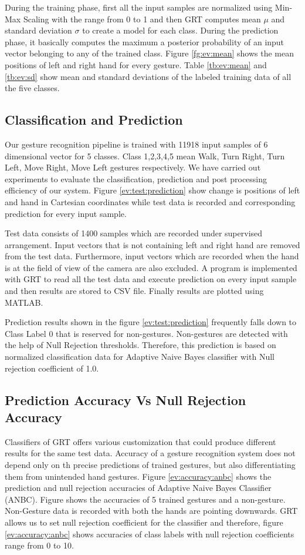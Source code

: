 During the training phase, first all the input samples are normalized using Min-Max Scaling with the range from 0 to 1 and then GRT computes mean $\mu$ and standard deviation $\sigma$ to create a model for each class. During the prediction phase, it basically computes the maximum a posterior probability of an input vector belonging to any of the trained class. Figure \ref{fg:ev:mean} shows the mean positions of left and right hand for every gesture. Table \ref{tb:ev:mean} and \ref{tb:ev:sd} show mean and standard deviations of the labeled training data of all the five classes. 

\subsection{Classification and Prediction} Our gesture recognition pipeline is trained with 11918 input samples of 6 dimensional vector for 5 classes. Class 1,2,3,4,5 mean Walk, Turn Right, Turn Left, Move Right, Move Left gestures respectively. We have carried out experiments to evaluate the classification, prediction and post processing efficiency of our system. Figure \ref{ev:test:prediction} show change is positions of left and hand in Cartesian coordinates while test data is recorded and corresponding prediction for every input sample.

Test data consists of 1400 samples which are recorded under supervised arrangement. Input vectors that is not containing left and right hand are removed from the test data. Furthermore, input vectors which are recorded when the hand is at the field of view of the camera are also excluded. A program is implemented with GRT to read all the test data and execute prediction on every input sample and then results are stored to CSV file. Finally results are plotted using MATLAB.

Prediction results shown in the figure \ref{ev:test:prediction} frequently falls down to Class Label 0 that is reserved for non-gestures. Non-gestures are detected with the help of Null Rejection thresholds. Therefore, this prediction is based on normalized classification data for Adaptive Naive Bayes classifier with Null rejection coefficient of 1.0.

\subsection{Prediction Accuracy Vs Null Rejection Accuracy} \label{sec:ev:accuracy} Classifiers of GRT offers various customization that could produce different results for the same test data. Accuracy of a gesture recognition system does not depend only on th precise predictions of trained gestures, but also differentiating them from unintended hand gestures. Figure \ref{ev:accuracy:anbc} shows the prediction and null rejection accuracies of Adaptive Naive Bayes Classifier (ANBC). Figure shows the accuracies of 5 trained gestures and a non-gesture. Non-Gesture data is recorded with both the hands are pointing downwards. GRT allows us to set null rejection coefficient for the classifier and therefore, figure \ref{ev:accuracy:anbc} shows accuracies of class labels with null rejection coefficients range from 0 to 10.

